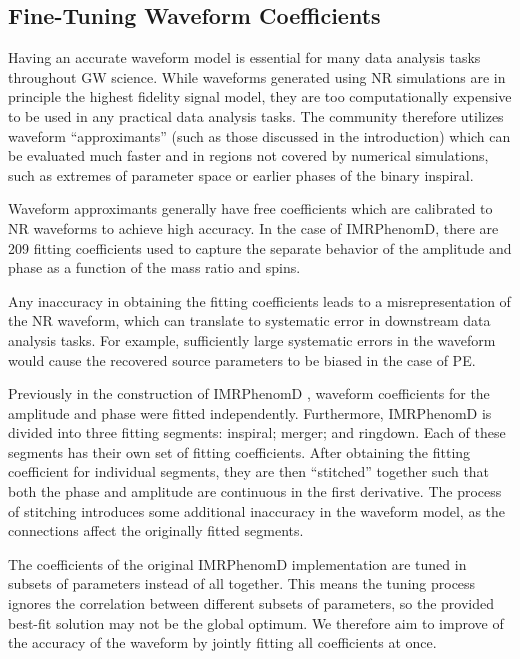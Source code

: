 \documentclass[twocolumn]{aastex631}
\begin{document}
\subsection{Fine-Tuning Waveform Coefficients}
\label{subsec:coeffs}

Having an accurate waveform model is essential for many data analysis tasks throughout
GW science.
While waveforms generated using NR simulations are in principle the highest fidelity signal model, they are too computationally expensive to be used in any practical data analysis tasks.
The community therefore utilizes waveform ``approximants'' (such as those discussed in the introduction) which can be evaluated much faster and in regions not covered by numerical simulations, such as extremes of parameter space or earlier phases of the binary inspiral.

Waveform approximants generally have free coefficients which are calibrated
to NR waveforms to achieve high accuracy.
In the case of IMRPhenomD, there are 209 fitting coefficients used to capture the separate behavior of the amplitude and phase as a function of the mass ratio and spins.

Any inaccuracy in obtaining the fitting coefficients
leads to a misrepresentation of the NR waveform, which can translate to systematic
error in downstream data analysis tasks. For example, sufficiently large
systematic errors in the waveform would cause the recovered source parameters to be biased
in the case of PE.

Previously in the construction of IMRPhenomD \citep{Khan:2015jqa}, waveform
coefficients for the amplitude and phase were fitted independently.
Furthermore, IMRPhenomD is divided into three fitting segments: inspiral; merger; and ringdown.
Each of these segments has their own set of fitting coefficients.
After obtaining the fitting coefficient for individual segments, they are then ``stitched'' together such that both the phase and amplitude are continuous in the first derivative.
The process of stitching introduces some additional inaccuracy in the waveform model, as the connections affect the originally fitted segments.

The coefficients of the original IMRPhenomD implementation are tuned in subsets of parameters instead of all together. 
This means the tuning process ignores the correlation between different subsets of parameters, so the provided best-fit solution may not be the global optimum. 
We therefore aim to improve of the accuracy of the waveform by jointly fitting all coefficients at once.
\end{document}
